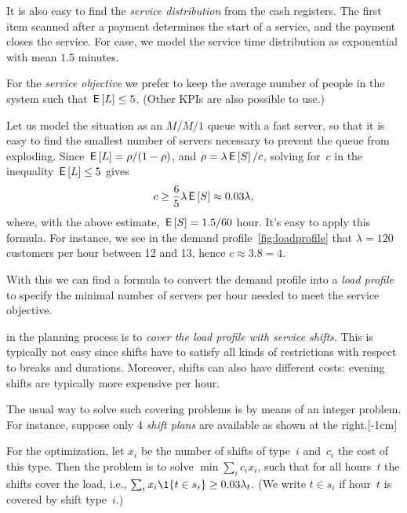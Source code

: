 \documentclass[stochastic-or.tex]{subfiles}
\begin{document}
It is also easy to find the\emph{ service distribution} from the cash registers.
The first item scanned after a payment determines the start of a service, and the payment closes the service. For ease, we model the service time distribution as exponential with mean $1.5$ minutes.

For the \emph{service objective} we prefer to keep the average number of people in the system such that $\,\mathsf{E}\left[L\right] \leq 5$. (Other KPIs are also possible to use.)

Let us model the situation as an $M/M/1$ queue with a fast server, so that it is easy to find the smallest number of servers necessary to prevent the queue from exploding.
Since $\,\mathsf{E}\left[L\right] = \rho/(1-\rho)$, and $\rho=\lambda \,\mathsf{E}\left[S\right] /c$, solving for~$c$ in the inequality $\,\mathsf{E}\left[L\right] \leq 5$ gives
\begin{equation*}
c \geq \frac 6 5 \lambda \,\mathsf{E}\left[S\right] \approx 0.03 \lambda,
\end{equation*}
where, with  the above estimate, $\,\mathsf{E}\left[S\right]=1.5/60$ hour.
It's easy to apply this formula. For instance,  we see in the demand profile~\cref{fig:loadprofile} that $\lambda= 120$ customers per hour between 12 and 13, hence $c\approx 3.8 = 4$.

With this we can find a formula to convert the demand profile into a \emph{load profile} to specify the minimal number of servers per hour needed to meet the service objective.


 in the planning process is to \emph{cover the load profile with service shifts}.
This is typically not easy since shifts have to satisfy all kinds of restrictions with respect to breaks and durations.  Moreover, shifts can also have different costs: evening shifts are typically  more expensive per hour.

The usual way to solve such covering problems is by means of an integer
problem. For instance, suppose only 4 \emph{shift plans} are available as shown at the right.[-1cm]

For the optimization, let $x_i$ be the number of shifts of type~$i$ and~$c_i$ the cost of this type.
Then the problem is to solve $\min \sum_i c_i x_i$,
such that for all hours~$t$ the shifts cover the load, i.e., $\sum_i x_i \1{t \in s_i} \geq 0.03 \lambda_t$.
(We write $t\in s_i$ if hour~$t$ is covered by shift type~$i$.)
\end{document}
